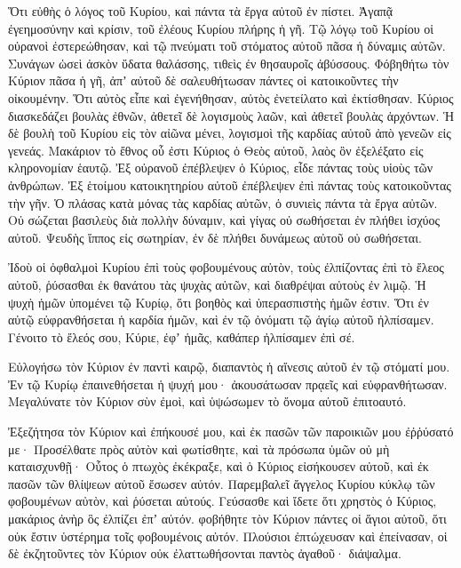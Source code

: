 \begin{spacing}{1.1}
\begin{multicols}{2}
Ὅτι εὐθὴς ὁ λόγος τοῦ Κυρίου, καὶ πάντα τὰ ἔργα αὐτοῦ ἐν πίστει.
Ἀγαπᾷ ἐγεημοσύνην καὶ κρίσιν, τοῦ ἐλέους Κυρίου πλήρης ἡ γῆ.
Τῷ λόγῳ τοῦ Κυρίου οἱ οὐρανοὶ ἐστερεώθησαν, καὶ τῷ πνεύματι τοῦ στόματος αὐτοῦ πᾶσα ἡ δύναμις αὐτῶν.
Συνάγων ὡσεὶ ἀσκὸν ὕδατα θαλάσσης, τιθεὶς ἐν θησαυροῖς ἀβύσσους.
Φόβηθήτω τὸν Κύριον πᾶσα ἡ γῆ, ἀπʼ αὐτοῦ δὲ σαλευθήτωσαν πάντες οἱ κατοικοῦντες τὴν οἰκουμένην.
Ὅτι αὐτὸς εἶπε καὶ ἐγενήθησαν, αὐτὸς ἐνετείλατο καὶ ἐκτίσθησαν.
Κύριος διασκεδάζει βουλὰς ἐθνῶν, ἀθετεῖ δὲ λογισμοὺς λαῶν, καὶ ἀθετεῖ βουλὰς ἀρχόντων.
Ἡ δὲ βουλὴ τοῦ Κυρίου εἰς τὸν αἰῶνα μένει, λογισμοὶ τῆς καρδίας αὐτοῦ ἀπὸ γενεῶν εἰς γενεάς.
Μακάριον τὸ ἔθνος οὗ ἐστι Κύριος ὁ Θεὸς αὐτοῦ, λαὸς ὃν ἐξελέξατο εἰς κληρονομίαν ἑαυτῷ.
Ἐξ οὐρανοῦ ἐπέβλεψεν ὁ Κύριος, εἶδε πάντας τοὺς υἱοὺς τῶν ἀνθρώπων.
Ἐξ ἑτοίμου κατοικητηρίου αὐτοῦ ἐπέβλεψεν ἐπὶ πάντας τοὺς κατοικοῦντας τὴν γῆν.
Ὁ πλάσας κατὰ μόνας τὰς καρδίας αὐτῶν, ὁ συνιεὶς πάντα τὰ ἔργα αὐτῶν.
Οὐ σώζεται βασιλεὺς διὰ πολλὴν δύναμιν, καὶ γίγας οὐ σωθήσεται ἐν πλήθει ἰσχύος αὐτοῦ.
Ψευδὴς ἵππος εἰς σωτηρίαν, ἐν δὲ πλήθει δυνάμεως αὐτοῦ οὐ σωθήσεται.

Ἰδοὺ οἱ ὀφθαλμοὶ Κυρίου ἐπὶ τοὺς φοβουμένους αὐτὸν, τοὺς ἐλπίζοντας ἐπὶ τὸ ἔλεος αὐτοῦ,
ῥύσασθαι ἐκ θανάτου τὰς ψυχὰς αὐτῶν, καὶ διαθρέψαι αὐτοὺς ἐν λιμῷ.
Ἡ ψυχὴ ἡμῶν ὑπομένει τῷ Κυρίῳ, ὅτι βοηθὸς καὶ ὑπερασπιστὴς ἡμῶν ἐστιν.
Ὅτι ἐν αὐτῷ εὐφρανθήσεται ἡ καρδία ἡμῶν, καὶ ἐν τῷ ὀνόματι τῷ ἁγίῳ αὐτοῦ ἠλπίσαμεν.
Γένοιτο τὸ ἔλεός σου, Κύριε, ἐφʼ ἡμᾶς, καθάπερ ἠλπίσαμεν ἐπὶ σέ.

Εὐλογήσω τὸν Κύριον ἐν παντὶ καιρῷ, διαπαντὸς ἡ αἴνεσις αὐτοῦ ἐν τῷ στόματί μου.
Ἐν τῷ Κυρίῳ ἐπαινεθήσεται ἡ ψυχή μου· ἀκουσάτωσαν πρᾳεῖς καὶ εὐφρανθήτωσαν.
Μεγαλύνατε τὸν Κύριον σὺν ἐμοὶ, καὶ ὑψώσωμεν τὸ ὄνομα αὐτοῦ ἐπιτοαυτό.

Ἐξεζήτησα τὸν Κύριον καὶ ἐπήκουσέ μου, καὶ ἐκ πασῶν τῶν παροικιῶν μου ἐῤῥύσατό με·
Προσέλθατε πρὸς αὐτὸν καὶ φωτίσθητε, καὶ τὰ πρόσωπα ὑμῶν οὐ μὴ καταισχυνθῇ·
Οὗτος ὁ πτωχὸς ἐκέκραξε, καὶ ὁ Κύριος εἰσήκουσεν αὐτοῦ, καὶ ἐκ πασῶν τῶν θλίψεων αὐτοῦ ἔσωσεν αὐτόν.
Παρεμβαλεῖ ἄγγελος Κυρίου κύκλῳ τῶν φοβουμένων αὐτὸν, καὶ ῥύσεται αὐτούς.
Γεύσασθε καὶ ἴδετε ὅτι χρηστὸς ὁ Κύριος, μακάριος ἀνὴρ ὃς ἐλπίζει ἐπʼ αὐτόν.
φοβήθητε τὸν Κύριον πάντες οἱ ἅγιοι αὐτοῦ, ὅτι οὐκ ἔστιν ὑστέρημα τοῖς φοβουμένοις αὐτόν.
Πλούσιοι ἐπτώχευσαν καὶ ἐπείνασαν, οἱ δὲ ἐκζητοῦντες τὸν Κύριον οὐκ ἐλαττωθήσονται παντὸς ἀγαθοῦ· διάψαλμα.


\end{multicols}
\end{spacing}
